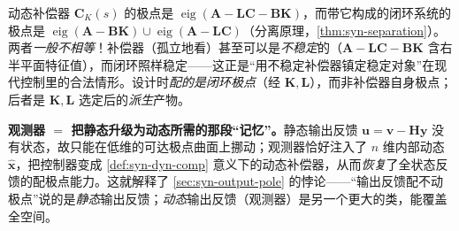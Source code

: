 \begin{pitfall}
动态补偿器 $\mathbf C_K(s)$ 的极点是 $\operatorname{eig}(\mathbf A-\mathbf L\mathbf C-\mathbf B\mathbf K)$，而带它构成的闭环系统的极点是 $\operatorname{eig}(\mathbf A-\mathbf B\mathbf K)\cup\operatorname{eig}(\mathbf A-\mathbf L\mathbf C)$（分离原理，\cref{thm:syn-separation}）。两者\emph{一般不相等}！补偿器（孤立地看）甚至可以是\emph{不稳定}的（$\mathbf A-\mathbf L\mathbf C-\mathbf B\mathbf K$ 含右半平面特征值），而闭环照样稳定——这正是“用不稳定补偿器镇定稳定对象”在现代控制里的合法情形。设计时\emph{配的是闭环极点}（经 $\mathbf K,\mathbf L$），而非补偿器自身极点；后者是 $\mathbf K,\mathbf L$ 选定后的\emph{派生}产物。
\end{pitfall}

\begin{insight}
\textbf{观测器 $=$ 把静态升级为动态所需的那段“记忆”。}\;静态输出反馈 $\mathbf u=\mathbf v-\mathbf H\mathbf y$ 没有状态，故只能在低维的可达极点曲面上挪动；观测器恰好注入了 $n$ 维内部动态 $\hat{\mathbf x}$，把控制器变成 \cref{def:syn-dyn-comp} 意义下的动态补偿器，从而\emph{恢复}了全状态反馈的配极点能力。这就解释了 \cref{sec:syn-output-pole} 的悖论——“输出反馈配不动极点”说的是\emph{静态}输出反馈；\emph{动态}输出反馈（观测器）是另一个更大的类，能覆盖全空间。
\end{insight}


